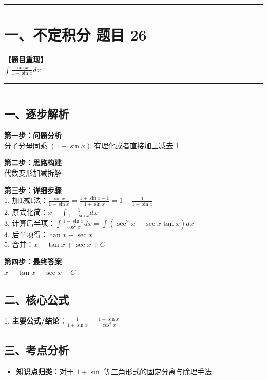 ﻿\documentclass[12pt, a4paper]{ctexart}
\newcommand{\TopSeparator}{
    \par\noindent\rule{\textwidth}{1.5pt}\vspace{0.5em}
}
\newcommand{\AnalysisSeparator}{
    \par\noindent\rule{\textwidth}{0.5pt}\vspace{0.2em}\hrule\vspace{0.5em}
}
\newenvironment{RedAnalysis}{
    \par
    \color{red} 
}{
    \par
    \color{black} 
}
\begin{document}
\vspace{2em}

\TopSeparator
\section*{一、不定积分 题目 26}

\textbf{【题目重现】} \\
$\int \frac{\sin x}{1+\sin x} dx$

\AnalysisSeparator

\begin{RedAnalysis}

	\subsection*{一、逐步解析}

	\textbf{第一步：问题分析} \\
	分子分母同乘 $(1-\sin x)$ 有理化或者直接加上减去 1

	\textbf{第二步：思路构建} \\
	代数变形加减拆解

	\textbf{第三步：详细步骤} \\
	1. 加1减1法：$\frac{\sin x}{1+\sin x} = \frac{1+\sin x - 1}{1+\sin x} = 1 - \frac{1}{1+\sin x}$ \\ 
	2. 原式化简：$x - \int \frac{1}{1+\sin x} dx$ \\ 
	3. 计算后半项：$\int \frac{1-\sin x}{\cos^2 x} dx = \int (\sec^2 x - \sec x \tan x) dx$ \\ 
	4. 后半项得：$\tan x - \sec x$ \\ 
	5. 合并：$x - \tan x + \sec x + C$

	\textbf{第四步：最终答案} \\
	$x - \tan x + \sec x + C$

	\subsection*{二、核心公式}
	1. \textbf{主要公式/结论}：$\frac{1}{1+\sin x} = \frac{1-\sin x}{\cos^2 x}$

	\subsection*{三、考点分析}
	\begin{itemize}
		\item \textbf{知识点归类}：对于 $1+\sin$ 等三角形式的固定分离与除理手法
	\end{itemize}

\end{RedAnalysis}
\end{document}
